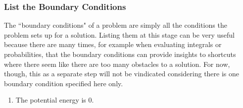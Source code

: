 \subsubsection*{List the Boundary Conditions}
The ``boundary conditions" of a problem are simply all the conditions the problem sets up for a solution. Listing them at this stage can be very useful because there are many times, for example when evaluating integrals or probabilities, that the boundary conditions can provide insights to shortcuts where there seem like there are too many obstacles to a solution. For now, though, this as a separate step will not be vindicated considering there is one boundary condition specified here only.
\begin{enumerate}
    \item The potential energy is $0$.
\end{enumerate}
